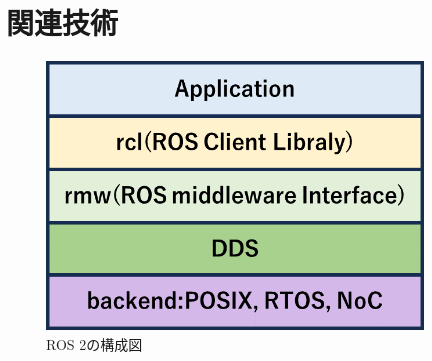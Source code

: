 \chapter{関連技術}
\label{sec:usage}
\begin{figure}[ht]
    \centering
    \includegraphics[width=10cm]{images/fig2_ros2_configuration.png}
    \caption{ROS 2の構成図}
    \label{fig:ros2_configuration}
\end{figure}
